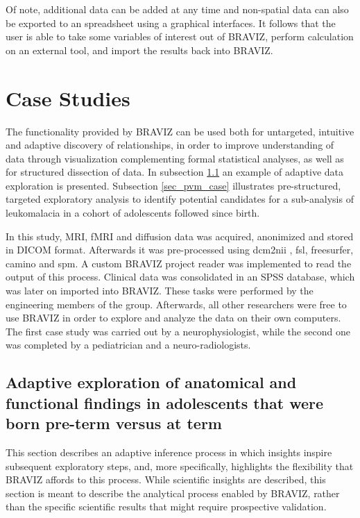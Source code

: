 \documentclass{frontiersHLTH}
\begin{document}
Of note, additional data can be added at any time and non-spatial data can also be exported to an spreadsheet using a graphical interfaces. It follows that the user is able to take some variables of interest out of BRAVIZ, perform calculation on an external tool, and import the results back into BRAVIZ.




\section{Case Studies}

The functionality provided by BRAVIZ can be used both for untargeted, intuitive and adaptive discovery of relationships, in order to improve understanding of data through visualization complementing formal statistical analyses, as well as for structured dissection of data. In subsection \ref{sec_case_cyril} an example of adaptive data exploration is presented. Subsection \ref{sec_pvm_case} illustrates pre-structured, targeted exploratory analysis to identify potential candidates for a sub-analysis of leukomalacia in a cohort of adolescents followed since birth. 

In this study, MRI, fMRI and diffusion data was acquired, anonimized and stored in DICOM format. Afterwards it was pre-processed using dcm2nii \cite{rorden_mricron_2007}, fsl\cite{jenkinson_fsl_2012}, freesurfer\cite{fischl_freesurfer_2012}, camino\cite{cook_camino:_2006} and spm\cite{friston_statistical_2007}. A custom BRAVIZ project reader was implemented to read the output of this process. 
Clinical data was consolidated in an SPSS database, which was later on imported into BRAVIZ. These tasks were performed by the engineering members of the group. Afterwards, all other researchers were free to use BRAVIZ in order to explore and analyze the data on their own computers. The first case study was carried out by a neurophysiologist, while the second one was completed by a  pediatrician and a neuro-radiologists. 

 
\subsection{Adaptive exploration of anatomical and functional findings in adolescents that were born pre-term versus at term}
\label{sec_case_cyril}

This section describes an adaptive inference process in which insights inspire subsequent exploratory steps, and, more specifically, highlights the flexibility that BRAVIZ affords to this process. While scientific insights are described, this section is meant to describe the analytical process enabled by BRAVIZ, rather than the specific scientific results that might require prospective validation.
\end{document}
